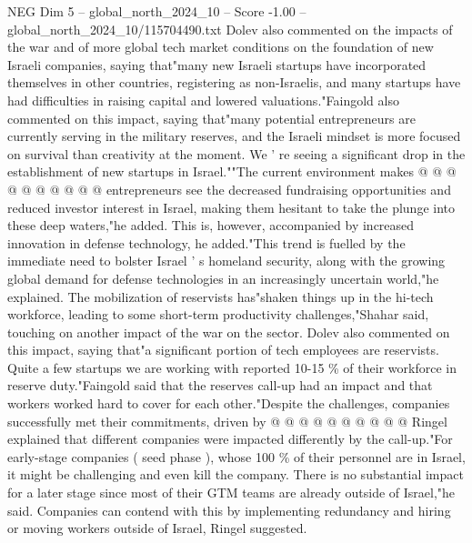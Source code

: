\begin{textsample}{NEG Dim 5 – global\_north\_2024\_10 – Score -1.00 – global\_north\_2024\_10/115704490.txt}
Dolev also commented on the impacts of the war and of more global tech market conditions on the foundation of new Israeli companies, saying that"many new Israeli startups have incorporated themselves in other countries, registering as non-Israelis, and many startups have had difficulties in raising capital and lowered valuations."Faingold also commented on this impact, saying that"many potential entrepreneurs are currently serving in the military reserves, and the Israeli mindset is more focused on survival than creativity at the moment.
We ' re seeing a significant drop in the establishment of new startups in Israel.""The current environment makes @ @ @ @ @ @ @ @ @ @ entrepreneurs see the decreased fundraising opportunities and reduced investor interest in Israel, making them hesitant to take the plunge into these deep waters,"he added.
This is, however, accompanied by increased innovation in defense technology, he added."This trend is fuelled by the immediate need to bolster Israel ' s homeland security, along with the growing global demand for defense technologies in an increasingly uncertain world,"he explained.
The mobilization of reservists has"shaken things up in the hi-tech workforce, leading to some short-term productivity challenges,"Shahar said, touching on another impact of the war on the sector.
Dolev also commented on this impact, saying that"a significant portion of tech employees are reservists.
Quite a few startups we are working with reported 10-15 \% of their workforce in reserve duty."Faingold said that the reserves call-up had an impact and that workers worked hard to cover for each other."Despite the challenges, companies successfully met their commitments, driven by @ @ @ @ @ @ @ @ @ @ Ringel explained that different companies were impacted differently by the call-up."For early-stage companies ( seed phase ), whose 100 \% of their personnel are in Israel, it might be challenging and even kill the company.
There is no substantial impact for a later stage since most of their GTM teams are already outside of Israel,"he said.
Companies can contend with this by implementing redundancy and hiring or moving workers outside of Israel, Ringel suggested.

\end{textsample}

